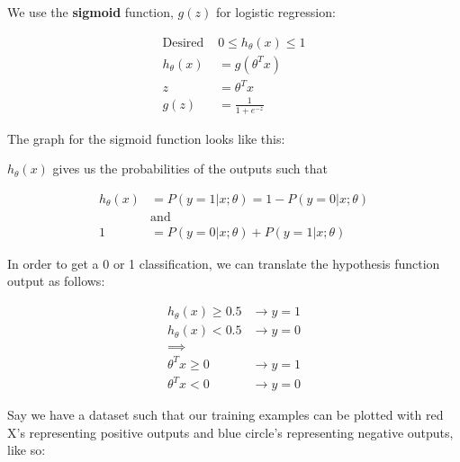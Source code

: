\noindent We use the \textbf{sigmoid} function, $g(z)$ for logistic regression:

\begin{align*}
    \text{Desired } & 0\leq h_{\theta}(x)\leq 1 \\
    h_{\theta}(x)  &= g(\theta^T x) \\
    z              &= \theta^T x \\
    g(z)           &= \frac{1}{1+e^{-z}}
\end{align*}

\noindent The graph for the sigmoid function looks like this:

\begin{center}
\end{center}

\noindent $h_{\theta}(x)$ gives us the probabilities of the outputs such that

\begin{align*}
    h_{\theta}(x)   &= P(y=1|x;\theta) = 1 - P(y=0|x;\theta) \\
    & \text{and} \\
    1               &= P(y=0|x;\theta) + P(y=1|x;\theta)
\end{align*}

\noindent In order to get a 0 or 1 classification, we can translate the hypothesis function output as
follows:

\begin{align*}
    h_{\theta}(x) \geq 0.5 &\to y=1 \\
    h_{\theta}(x) < 0.5    &\to y=0 \\
    \implies \\
    \theta^T x \geq 0  &\to y=1 \\
    \theta^T x < 0     &\to y=0
\end{align*}

\noindent Say we have a dataset such that our training examples can be plotted with red X's
representing positive outputs and blue circle's representing negative outputs, like so:

